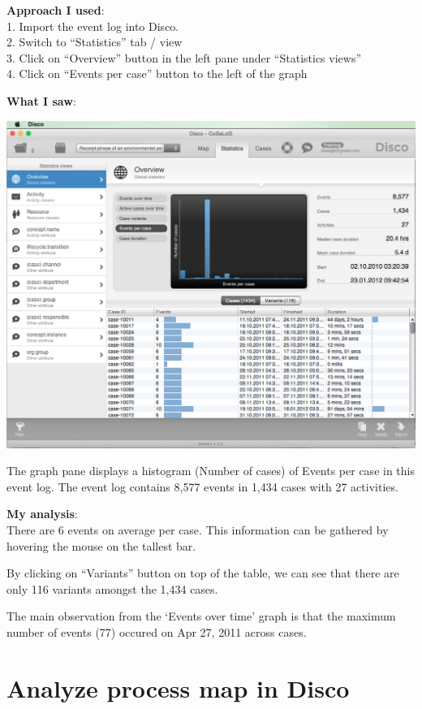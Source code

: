 \documentclass[]{article}
\begin{document}
\textbf{Approach I used}:\\1. Import the event log into Disco.\\2.
Switch to ``Statistics'' tab / view\\3. Click on ``Overview'' button in
the left pane under ``Statistics views''\\4. Click on ``Events per
case'' button to the left of the graph

\textbf{What I saw}:

\includegraphics{CoSeLoG_Step_01_Q_01.png}

The graph pane displays a histogram (Number of cases) of Events per case
in this event log. The event log contains 8,577 events in 1,434 cases
with 27 activities.

\textbf{My analysis}:\\There are 6 events on average per case. This
information can be gathered by hovering the mouse on the tallest bar.

By clicking on ``Variants'' button on top of the table, we can see that
there are only 116 variants amongst the 1,434 cases.

The main observation from the `Events over time' graph is that the
maximum number of events (77) occured on Apr 27, 2011 across cases.

\section{Analyze process map in
Disco}\label{analyze-process-map-in-disco}
\end{document}
